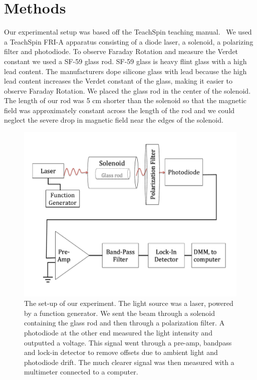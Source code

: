 \documentclass[prb,preprint]{revtex4-1}
\begin{document}
\section{Methods}

Our experimental setup was based off the TeachSpin teaching manual.~\cite{teachspin} We used a TeachSpin FRI-A apparatus consisting of a diode laser, a solenoid, a polarizing filter and photodiode. To observe Faraday Rotation and measure the Verdet constant we used a SF-59 glass rod. SF-59 glass is heavy flint glass with a high lead content. The manufacturers dope silicone glass with lead because the high lead content increases the Verdet constant of the glass, making it easier to observe Faraday Rotation.\cite{opticalglass} We placed the glass rod in the center of the solenoid. The length of our rod was 5 cm shorter than the solenoid so that the magnetic field was approximately constant across the length of the rod and we could neglect the severe drop in magnetic field near the edges of the solenoid.

\begin{figure}[h!]
\centering
\includegraphics[width=6in]{Faraday_lab_set-up.pdf}
\caption{The set-up of our experiment. The light source was a laser, powered by a function generator. We sent the beam through a solenoid containing the glass rod and then through a polarization filter. A photodiode at the other end measured the light intensity and outputted a voltage. This signal went through a pre-amp, bandpass and lock-in detector to remove offsets due to ambient light and photodiode drift. The much clearer signal was then measured with a multimeter connected to a computer.}
\label{set-up}
\end{figure}
\end{document}
